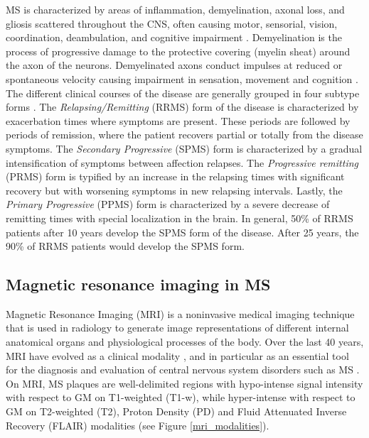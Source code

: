 MS is characterized by areas of inflammation, demyelination, axonal loss, and gliosis scattered throughout the CNS, often causing motor, sensorial, vision, coordination, deambulation, and cognitive impairment \cite{Compston2002}. Demyelination is the process of progressive damage to the protective covering (myelin sheat) around the axon of the neurons. Demyelinated axons conduct impulses at reduced or spontaneous velocity causing impairment in sensation, movement and cognition \cite{Compston2008}. The different clinical courses of the disease are generally grouped in four subtype forms \cite{Lublin1996}. The  \textit{Relapsing/Remitting} (RRMS) form of the disease is characterized by exacerbation times where symptoms are present. These periods are followed by periods of remission, where the patient recovers partial or totally from the disease symptoms. The \textit{Secondary Progressive} (SPMS) form is characterized by a gradual intensification of symptoms between affection relapses. The \textit{Progressive remitting} (PRMS) form is typified by an increase in the relapsing times with significant recovery but with worsening symptoms in new relapsing intervals. Lastly, the \textit{Primary Progressive} (PPMS) form is characterized by a severe decrease of remitting times with special localization in the brain. In general, 50\% of RRMS patients after 10 years develop the SPMS form of the disease. After 25 years, the 90\% of RRMS patients would develop the SPMS form. 


\subsection{Magnetic resonance imaging in MS}
\label{subsec:introduction_magnetic_resonance_imaging}
Magnetic Resonance Imaging (MRI) is a noninvasive medical imaging technique that is used in radiology to generate image representations of different internal anatomical organs and physiological processes of the body. Over the last 40 years, MRI have evolved as a clinical modality \cite{Geva2006}, and in particular as an essential tool for the diagnosis and evaluation of central nervous system disorders such as MS \cite{Edelman1993}. On MRI, MS plaques are well-delimited regions with hypo-intense signal intensity with respect to GM on T1-weighted (T1-w), while hyper-intense with respect to GM on T2-weighted (T2), Proton Density (PD) and Fluid Attenuated Inverse Recovery (FLAIR) modalities (see Figure \ref{mri_modalities}).

